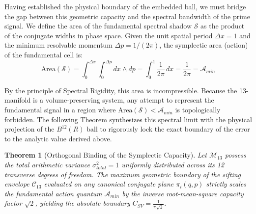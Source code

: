 \documentclass[sn-mathphys-num, pdflatex]{sn-jnl}
\newtheorem{theorem}{Theorem}[section]
\begin{document}
Having established the physical boundary of the embedded ball, we must bridge the gap between this geometric capacity and the spectral bandwidth of the prime signal. We define the area of the fundamental spectral shadow $\mathcal{S}$ as the product of the conjugate widths in phase space. Given the unit spatial period $\Delta x = 1$ and the minimum resolvable momentum $\Delta p = 1/(2\pi)$, the symplectic area (action) of the fundamental cell is:
\begin{equation}
\label{eq:spectral_shadow}
\text{Area}(\mathcal{S}) = \int_{0}^{\Delta x} \int_{0}^{\Delta p} dx \wedge dp = \int_{0}^{1} \frac{1}{2\pi} \, dx = \frac{1}{2\pi} = \mathcal{A}_{min}
\end{equation}

By the principle of Spectral Rigidity, this area is incompressible. Because the 13-manifold is a volume-preserving system, any attempt to represent the fundamental signal in a region where $\text{Area}(\mathcal{S}) < \mathcal{A}_{min}$ is topologically forbidden. The following Theorem synthesizes this spectral limit with the physical projection of the $B^{12}(R)$ ball to rigorously lock the exact boundary of the error to the analytic value derived above.

\begin{theorem}[Orthogonal Binding of the Symplectic Capacity]
\label{the:orthogonal_binding}
\textit{Let $\mathcal{M}_{13}$ possess the total arithmetic variance $\sigma_{total}^2 = 1$ uniformly distributed across its 12 transverse degrees of freedom. The maximum geometric boundary of the sifting envelope $\mathcal{C}_{13}$ evaluated on any canonical conjugate plane $\pi_i(q, p)$ strictly scales the fundamental action quantum $\mathcal{A}_{min}$ by the inverse root-mean-square capacity factor $\sqrt{2}$, yielding the absolute boundary $C_{SV} = \frac{1}{\pi\sqrt{2}}$.}
\end{theorem}
\end{document}
